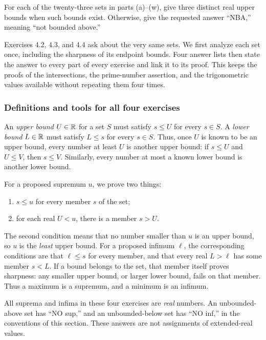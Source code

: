 
\goal For each of the twenty-three sets in parts (a)--(w), give
three distinct real upper bounds when such bounds exist. Otherwise,
give the requested answer ``NBA,'' meaning ``not bounded above.''

\idea Exercises 4.2, 4.3, and 4.4 ask about the very same sets.
We first analyze each set once, including the sharpness of its endpoint
bounds. Four answer lists then state the answer to every part of every
exercise and link it to its proof. This keeps the proofs of the
intersections, the prime-number assertion, and the trigonometric values
available without repeating them four times.

\subsubsection*{Definitions and tools for all four exercises}

An \emph{upper bound} $U\in\mathbb{R}$ for a set $S$ must satisfy $s\leq U$
for every $s\in S$. A \emph{lower bound} $L\in\mathbb{R}$ must satisfy
$L\leq s$ for every $s\in S$. Thus, once $U$ is known to be an upper
bound, every number at least $U$ is another upper bound: if $s\leq U$
and $U\leq V$, then $s\leq V$. Similarly, every number at most a known
lower bound is another lower bound.

For a proposed supremum $u$, we prove two things:
\begin{enumerate}
 \item $s\leq u$ for every member $s$ of the set;
 \item for each real $U<u$, there is a member $s>U$.
\end{enumerate}
The second condition means that no number smaller than $u$ is an
upper bound, so $u$ is the \emph{least} upper bound. For a proposed
infimum $\ell$, the corresponding conditions are that $\ell\leq s$
for every member, and that every real $L>\ell$ has some member $s<L$.
If a bound belongs to the set, that member itself proves sharpness:
any smaller upper bound, or larger lower bound, fails on that member.
Thus a maximum is a supremum, and a minimum is an infimum.

All suprema and infima in these four exercises are \emph{real}
numbers. An unbounded-above set has ``NO sup,'' and an unbounded-below
set has ``NO inf,'' in the conventions of this section. These answers
are not assignments of extended-real values.

